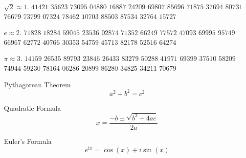 \begin{multicols}{2}
\(\sqrt 2 \approx 1.\)
\(41421\)
\(35623\)
\(73095\)
\(04880\)
\(16887\)
\(24209\)
\(69807\)
\(85696\)
\(71875\)
\(37694\)
\(80731\)
\(76679\)
\(73799\)
\(07324\)
\(78462\)
\(10703\)
\(88503\)
\(87534\)
\(32764\)
\(15727\)

\(e \approx 2.\)
\(71828\)
\(18284\)
\(59045\)
\(23536\)
\(02874\)
\(71352\)
\(66249\)
\(77572\)
\(47093\)
\(69995\)
\(95749\)
\(66967\)
\(62772\)
\(40766\)
\(30353\)
\(54759\)
\(45713\)
\(82178\)
\(52516\)
\(64274\)

\(\pi \approx 3.\)
\(14159\)
\(26535\)
\(89793\)
\(23846\)
\(26433\)
\(83279\)
\(50288\)
\(41971\)
\(69399\)
\(37510\)
\(58209\)
\(74944\)
\(59230\)
\(78164\)
\(06286\)
\(20899\)
\(86280\)
\(34825\)
\(34211\)
\(70679\)

\columnbreak

Pythagorean Theorem
\[a^2+b^2=c^2\]

Quadratic Formula
\[x=\frac{-b\pm\sqrt{b^2-4ac}}{2a}\]

Euler's Formula
\[e^{ix}=\cos(x)+i\sin(x)\]
\end{multicols}

\vfill


